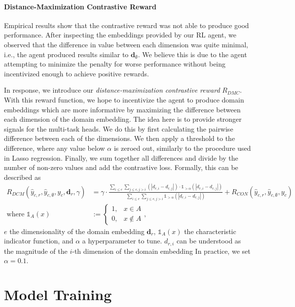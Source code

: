 \paragraph{Distance-Maximization Contrastive Reward}
Empirical results show that the contrastive reward was not able to produce good performance.
After inspecting the embeddings provided by our RL agent, we observed that the difference in value between each dimension was quite minimal, i.e., the agent produced results similar to $\boldsymbol{d}_\emptyset$.
We believe this is due to the agent attempting to minimize the penalty for worse performance without being incentivized enough to achieve positive rewards.

In response, we introduce our \textit{distance-maximization contrastive reward} $R_{DMC}$.
With this reward function, we hope to incentivize the agent to produce domain embeddings which are more informative by maximizing the difference between each dimension of the domain embedding.
The idea here is to provide stronger signals for the multi-task heads.
We do this by first calculating the pairwise difference between each of the dimensions.
We then apply a threshold to the difference, where any value below $\alpha$ is zeroed out, similarly to the procedure used in Lasso regression.
Finally, we sum together all differences and divide by the number of non-zero values and add the contrastive loss.
Formally, this can be described as
\begin{align}
	R_{DCM} (\hat{y}_{c,r}, \hat{y}_{c,\emptyset}, y_c, \boldsymbol{d}_r, \gamma) &= \gamma \cdot
		\frac{\sum_{i \leq e} \sum_{j \leq e, j > i} \left(|d_{r,i} - d_{r,j}|\right) \cdot \mathds{1}_{>\alpha}\left(|d_{r,i} - d_{r,j}|\right)}
		     {\sum_{i \leq e} \sum_{j \leq e, j > i} \mathds{1}_{>\alpha}\left(|d_{r,i} - d_{r,j}|\right)}
		+ R_{CON}(\hat{y}_{c,r}, \hat{y}_{c,\emptyset}, y_c) \\
	\text{where } \mathds{1}_A(x) &:= \begin{cases}
		1, & x \in A\\
		0, & x \notin A
	\end{cases},
\end{align}
$e$ the dimensionality of the domain embedding $\boldsymbol{d}_r$, $\mathds{1}_{A}(x)$ the characteristic indicator function, and $\alpha$ a hyperparameter to tune.
$d_{r,i}$ can be understood as the magnitude of the $i$-th dimension of the domain embedding
In practice, we set $\alpha = 0.1$.

\section{Model Training}\label{sec:methodology-training}


